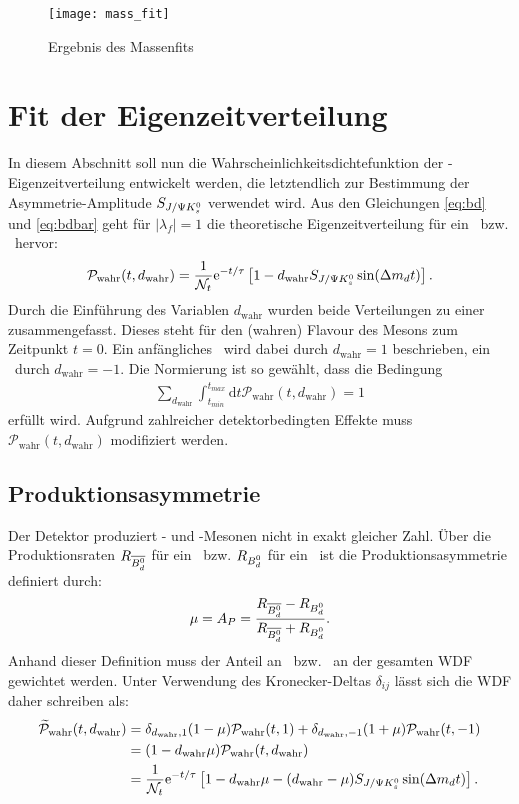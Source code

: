 \begin{figure}[hptb]
\centering
\texttt{[image: mass\_fit]}
\caption{Ergebnis des Massenfits}
\label{fig:fit_masse}
\end{figure}


\section{Fit der Eigenzeitverteilung} \label{kap:eigenzeitverteilung}
In diesem Abschnitt soll nun die Wahrscheinlichkeitsdichtefunktion der \Bd-Ei\-gen\-zeit\-ver\-tei\-lung entwickelt werden, die letztendlich zur Bestimmung der Asymmetrie-Amplitude $S_{J/\Psi K_s^0}$ verwendet wird. Aus den Gleichungen \ref{eq:bd} und \ref{eq:bdbar} geht für $|\lambda_f|=1$ die theoretische Eigenzeitverteilung für ein \Bd\ bzw. \Bdbar\ hervor:
\begin{align}
\mathcal{P}_{\text{wahr}}(t, d_{\text{wahr}}) = \frac{1}{\mathcal{N}_t}\mathrm{e}^{-t/\tau}\left[1-d_{\text{wahr}}S_{J/\Psi K_s^0}\sin(\Delta m_d t)\right].
\end{align}
Durch die Einführung des Variablen $d_{\text{wahr}}$ wurden beide Verteilungen zu einer zusammengefasst. Dieses steht für den (wahren) Flavour des Mesons zum Zeitpunkt $t=0$. Ein anfängliches \Bd\ wird dabei durch $d_{\text{wahr}}=1$ beschrieben, ein \Bdbar\ durch $d_{\text{wahr}}=-1$. Die Normierung ist so gewählt, dass die Bedingung
\begin{align}
\sum_{d_{\text{wahr}}}\int_{t_{min}}^{t_{max}}\mathrm{d}t\mathcal{P}_{\text{wahr}}(t, d_{\text{wahr}}) = 1
\end{align}
erfüllt wird. Aufgrund zahlreicher detektorbedingten Effekte muss $\mathcal{P}_{\text{wahr}}(t, d_{\text{wahr}})$ modifiziert werden.

\subsection{Produktionsasymmetrie}
Der Detektor produziert \Bd- und \Bdbar-Mesonen nicht in exakt gleicher Zahl. Über die Produktionsraten $R_{\text{$\overline{B_d^0}$}}$ für ein \Bdbar\ bzw. $R_{\text{$B_d^0$}}$ für ein \Bd\ ist die Produktionsasymmetrie definiert durch:
\begin{align}
\mu = A_P = \frac{R_{\text{$\overline{B_d^0}$}}-R_{\text{$B_d^0$}}}{R_{\text{$\overline{B_d^0}$}}+R_{\text{$B_d^0$}}}.
\end{align}
Anhand dieser Definition muss der Anteil an \Bd\ bzw. \Bdbar\ an der gesamten WDF gewichtet werden. Unter Verwendung des Kronecker-Deltas $\delta_{ij}$ lässt sich die WDF daher schreiben als:
\begin{align}
\nonumber \widetilde{\mathcal{P}}_{\text{wahr}}(t, d_{\text{wahr}}) &= \delta_{d_{\text{wahr}},1}(1-\mu)\mathcal{P}_{\text{wahr}}(t, 1) + \delta_{d_{\text{wahr}},-1}(1+\mu)\mathcal{P}_{\text{wahr}}(t, -1) \\
\nonumber &= (1-d_{\text{wahr}}\mu)\mathcal{P}_{\text{wahr}}(t, d_{\text{wahr}}) \\
&= \frac{1}{\mathcal{N}_t}\mathrm{e}^{-t/\tau}\left[1-d_{\text{wahr}}\mu - (d_{\text{wahr}}-\mu)S_{J/\Psi K_s^0}\sin(\Delta m_d t)\right].
\end{align}

